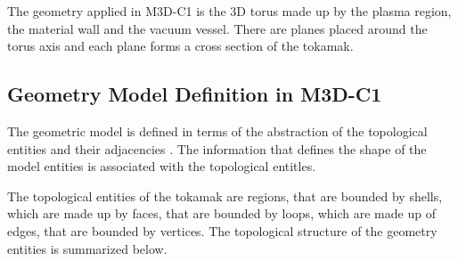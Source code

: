 \documentclass[11pt]{article}  %
\begin{document}
The geometry applied in M3D-C1 is the 3D torus made up by the plasma region, the material wall and the vacuum vessel.  There are planes placed around the torus axis and each plane forms a cross section of the tokamak.
\clearpage
\subsection{Geometry Model Definition in M3D-C1}
The geometric model is defined in terms of the abstraction of the topological entities and their adjacencies \cite{weiler1986topo}. The information that defines the shape of the model entities is associated with the topological entitles. 

The topological entities of the tokamak are regions, that are bounded by shells, which are made up by faces, that are bounded by loops, which are made up of edges, that are bounded by vertices. The topological structure of the geometry entities is summarized below.
\end{document}
